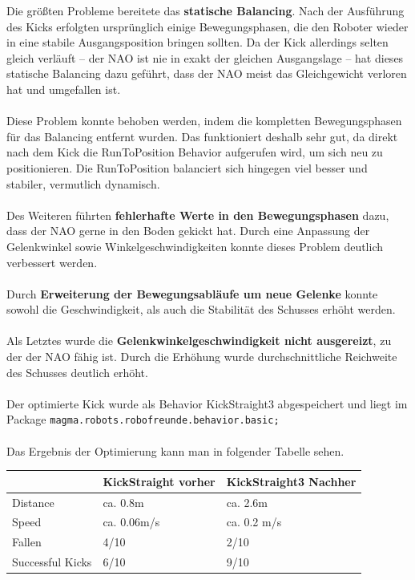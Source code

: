 \documentclass[fontsize=12pt,a4paper,final]{scrartcl}[2003/01/01]
\begin{document}
Die größten Probleme bereitete das \textbf{statische Balancing}. Nach der Ausführung des Kicks erfolgten ursprünglich einige Bewegungsphasen, die den Roboter wieder in eine stabile Ausgangsposition bringen sollten. Da der Kick allerdings selten gleich verläuft -- der NAO ist nie in exakt der gleichen Ausgangslage -- hat dieses statische Balancing dazu geführt, dass der NAO meist das Gleichgewicht verloren hat und umgefallen ist.\\
\\
Diese Problem konnte behoben werden, indem die kompletten Bewegungsphasen für das Balancing entfernt wurden. Das funktioniert deshalb sehr gut, da direkt nach dem Kick die RunToPosition Behavior aufgerufen wird, um sich neu zu positionieren. Die RunToPosition balanciert sich hingegen viel besser und stabiler, vermutlich dynamisch.\\
\\
Des Weiteren führten \textbf{fehlerhafte Werte in den Bewegungsphasen} dazu, dass der NAO gerne in den Boden gekickt hat. Durch eine Anpassung der Gelenkwinkel sowie Winkelgeschwindigkeiten konnte dieses Problem deutlich verbessert werden.\\
\\
Durch \textbf{Erweiterung der Bewegungsabläufe um neue Gelenke} konnte sowohl die Geschwindigkeit, als auch die Stabilität des Schusses erhöht werden.\\
\\
Als Letztes wurde die \textbf{Gelenkwinkelgeschwindigkeit nicht ausgereizt}, zu der der NAO fähig ist. Durch die Erhöhung wurde durchschnittliche Reichweite des Schusses deutlich erhöht.\\
\\
Der optimierte Kick wurde als Behavior KickStraight3 abgespeichert und liegt im Package \texttt{magma.robots.robofreunde.behavior.basic;}\\
\\
Das Ergebnis der Optimierung kann man in folgender Tabelle sehen.

\begin{tabularx}{\textwidth}{|X|X|X|}
\hline
 & \textbf{KickStraight vorher} & \textbf{KickStraight3 Nachher}\\
\hline
\hline
 Distance & ca. 0.8m & ca. 2.6m\\
\hline 
 Speed & ca. 0.06m/s & ca. 0.2 m/s\\
\hline
 Fallen & 4/10 & 2/10\\
\hline
 Successful Kicks & 6/10 & 9/10\\
\hline
\end{tabularx}
\end{document}
